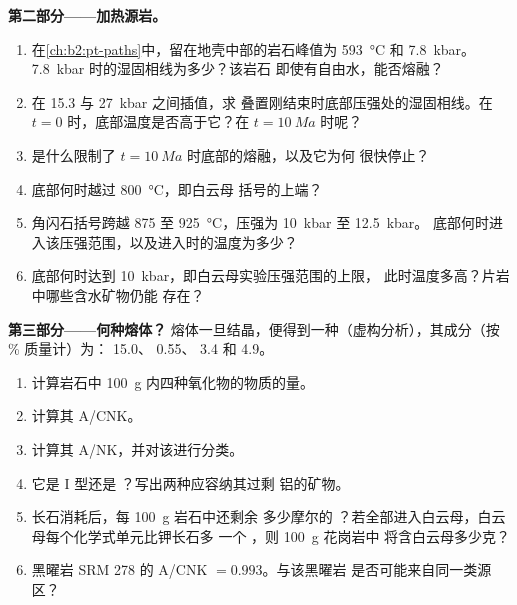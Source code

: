 \begin{problem}
\noindent\textbf{第二部分——加热源岩。}
\begin{enumerate}[resume]
\item 在\cref{ch:b2:pt-paths}中，留在地壳中部的岩石峰值为 \qty{593}{\celsius}
和 \qty{7.8}{kbar}。\qty{7.8}{kbar} 时的湿固相线为多少？该岩石
即使有自由水，能否熔融？
\item 在 15.3 与 \qty{27}{kbar} 之间插值，求
叠置刚结束时底部压强处的湿固相线。在 $t = 0$ 时，底部温度是否高于它？在 $t = \qty{10}{Ma}$ 时呢？
\item 是什么限制了 $t = \qty{10}{Ma}$ 时底部的熔融，以及它为何
很快停止？
\item 底部何时越过 \qty{800}{\celsius}，即白云母
括号的上端？
\item 角闪石括号跨越 875 至 \qty{925}{\celsius}，压强为 \qty{10}{kbar} 至 \qty{12.5}{kbar}。
底部何时进入该压强范围，以及进入时的温度为多少？
\item 底部何时达到 \qty{10}{kbar}，即白云母实验压强范围的上限，
此时温度多高？片岩中哪些含水矿物仍能
存在？
\end{enumerate}

\noindent\textbf{第三部分——何种熔体？}
熔体一旦结晶，便得到一种（虚构分析），其成分（按
\unit{\percent} 质量计）为： 15.0、 0.55、 3.4 和  4.9。
\begin{enumerate}[resume]
\item 计算岩石中 \qty{100}{\gram} 内四种氧化物的物质的量。
\item 计算其 A/CNK。
\item 计算其 A/NK，并对该进行分类。
\item 它是 I 型还是 ？写出两种应容纳其过剩
铝的矿物。
\item 长石消耗后，每 \qty{100}{\gram} 岩石中还剩余
多少摩尔的 ？若全部进入白云母，白云母每个化学式单元比钾长石多
一个 ，则 \qty{100}{\gram} 花岗岩中
将含白云母多少克？
\item 黑曜岩 SRM 278 的 A/CNK $= 0.993$。与该黑曜岩
是否可能来自同一类源区？
\end{enumerate}


\end{problem}
